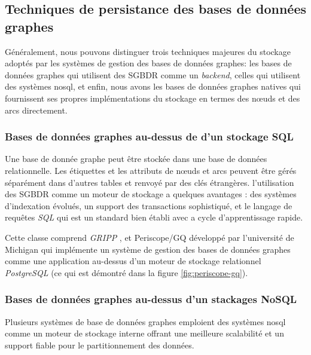   \subsection{Techniques de persistance des bases de données graphes}
  \label{sec:persistence-tech}
  Généralement, nous pouvons distinguer trois techniques majeures du
  stockage adoptés par les systèmes de gestion des bases de données
  graphes: les bases de données graphes qui utilisent des
  \acrshort{SGBDR} comme un \emph{backend}, celles qui utilisent des
  systèmes \acrshort{nosql}, et enfin, nous avons les bases de données
  graphes natives qui fournissent ses propres implémentations du
  stockage en termes des nœuds et des arcs directement.

    \subsubsection{Bases de données graphes au-dessus de d'un stockage  SQL}
    \label{sec:graphdb-over-sql}
    Une base de donnée graphe peut être stockée dans une base de
    données relationnelle. Les étiquettes et les attributs de nœuds et
    arcs peuvent être gérés séparément dans d'autres tables et renvoyé
    par des clés étrangères. l'utilisation des \acrshort{SGBDR} comme
    un moteur de stockage a quelques avantages : des systèmes
    d'indexation évolués, un support des transactions sophistiqué, et
    le langage de requêtes \emph{SQL} qui est un standard bien établi
    avec a cycle d'apprentissage rapide.

      

    Cette classe comprend \emph{GRIPP} \cite{trissl2007fast}, et
    Periscope/GQ \cite{tian2008periscope} développé par l'université
    de Michigan qui implémente un système de gestion des bases de
    données graphes comme une application au-dessus d'un moteur de
    stockage relationnel \emph{PostgreSQL} (ce qui est démontré dans
    la figure \ref{fig:periscope-gq}).


    \subsubsection{Bases de données graphes au-dessus d'un stackages NoSQL}
    \label{sec:graphdb-over-nosql}
    Plusieurs systèmes de base de données graphes emploient des
    systèmes \acrshort{nosql} comme un moteur de stockage interne
    offrant une meilleure scalabilité et un support fiable pour le
    partitionnement des données.

